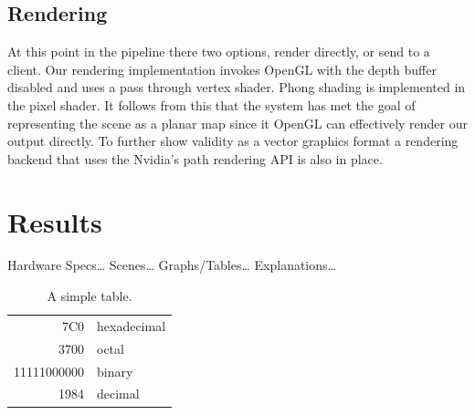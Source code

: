 \documentclass[review]{acmsiggraph}
\begin{document}
\subsection{Rendering}
At this point in the pipeline there two options, render directly, or send to a client. Our rendering implementation invokes OpenGL with the depth buffer disabled and uses a pass through vertex shader. Phong shading is implemented in the pixel shader. It follows from this that the system has met the goal of representing the scene as a planar map since it OpenGL can effectively render our output directly. To further show validity as a vector graphics format a rendering backend that uses the Nvidia’s path rendering API is also in place.
\section{Results}
Hardware Specs… Scenes… Graphs/Tables… Explanations…

\begin{table}[ht]
  \centering
  \caption{A simple table.}
  \begin{tabular}{|r|l|}
    \hline
    7C0 & hexadecimal \\
    3700 & octal \\ \cline{2-2}
    11111000000 & binary \\
    \hline \hline
    1984 & decimal \\
    \hline
  \end{tabular}
\end{table}
 
\end{document}
